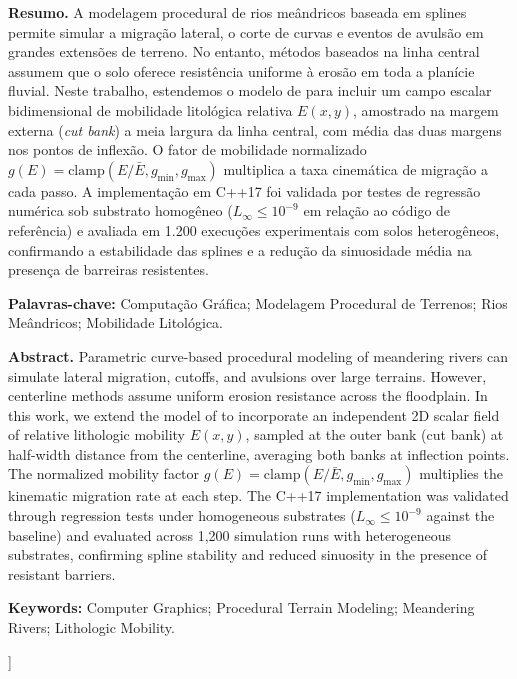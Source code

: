 \documentclass[9pt,a4paper,twocolumn]{extarticle}
\begin{document}
\begin{minipage}{0.94\textwidth}
\fontsize{8.5}{9.5}\selectfont
\noindent\textbf{Resumo.}
A modelagem procedural de rios meândricos baseada em splines permite simular a migração lateral, o corte de curvas e eventos de avulsão em grandes extensões de terreno. No entanto, métodos baseados na linha central assumem que o solo oferece resistência uniforme à erosão em toda a planície fluvial. Neste trabalho, estendemos o modelo de \textcite{paris2023meandering} para incluir um campo escalar bidimensional de mobilidade litológica relativa $E(x,y)$, amostrado na margem externa (\textit{cut bank}) a meia largura da linha central, com média das duas margens nos pontos de inflexão. O fator de mobilidade normalizado $g(E) = \text{clamp}(E/\bar{E}, g_{\min}, g_{\max})$ multiplica a taxa cinemática de migração a cada passo. A implementação em C++17 foi validada por testes de regressão numérica sob substrato homogêneo ($L_\infty \le 10^{-9}$ em relação ao código de referência) e avaliada em 1.200 execuções experimentais com solos heterogêneos, confirmando a estabilidade das splines e a redução da sinuosidade média na presença de barreiras resistentes.

\vspace{3pt}
\noindent\textbf{Palavras-chave:} Computação Gráfica; Modelagem Procedural de Terrenos; Rios Meândricos; Mobilidade Litológica.

\vspace{5pt}
\noindent\textbf{Abstract.}
Parametric curve-based procedural modeling of meandering rivers can simulate lateral migration, cutoffs, and avulsions over large terrains. However, centerline methods assume uniform erosion resistance across the floodplain. In this work, we extend the model of \textcite{paris2023meandering} to incorporate an independent 2D scalar field of relative lithologic mobility $E(x,y)$, sampled at the outer bank (cut bank) at half-width distance from the centerline, averaging both banks at inflection points. The normalized mobility factor $g(E) = \text{clamp}(E/\bar{E}, g_{\min}, g_{\max})$ multiplies the kinematic migration rate at each step. The C++17 implementation was validated through regression tests under homogeneous substrates ($L_\infty \le 10^{-9}$ against the baseline) and evaluated across 1,200 simulation runs with heterogeneous substrates, confirming spline stability and reduced sinuosity in the presence of resistant barriers.

\vspace{3pt}
\noindent\textbf{Keywords:} Computer Graphics; Procedural Terrain Modeling; Meandering Rivers; Lithologic Mobility.
\end{minipage}
\vspace{8pt}
]
\end{document}
